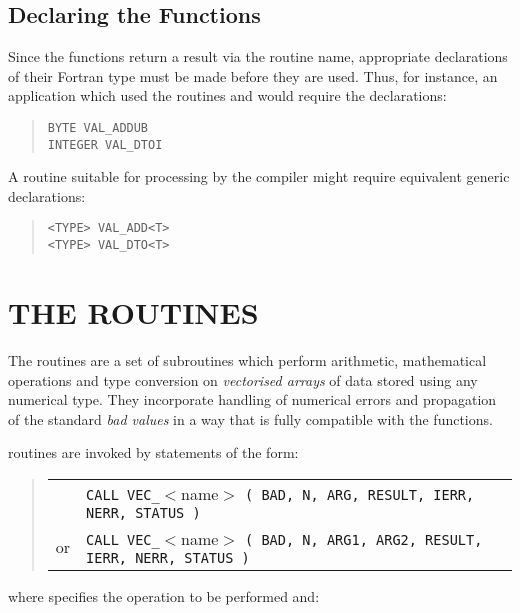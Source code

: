\subsection{Declaring the  Functions}

Since the  functions return a result via the routine name, 
appropriate declarations of their Fortran type must be made before they are 
used.
Thus, for instance, an application which used the routines  
and  would require the declarations: 

\begin{quote}
\verb#BYTE VAL_ADDUB#\\
\verb#INTEGER VAL_DTOI#
\end{quote}

A routine suitable for processing by the  compiler might
require equivalent generic declarations: 

\begin{quote}
\verb#<TYPE> VAL_ADD<T>#\\
\verb#<TYPE> VAL_DTO<T>#
\end{quote}

\section{THE  ROUTINES}

\label{section:vec}

The  routines are a set of subroutines which perform arithmetic,
mathematical operations and type conversion on {\em vectorised arrays} of
data stored using any numerical type. 
They incorporate handling of numerical errors and propagation of the
standard {\em bad values} in a way that is fully compatible with the
 functions. 

 routines are invoked by statements of the form:

\begin{quote}
\begin{tabular}{rl}
& \verb#CALL VEC_#$<$name$>$
\verb#( BAD, N, ARG, RESULT, IERR, NERR, STATUS )#\\
or & \verb#CALL VEC_#$<$name$>$
\verb#( BAD, N, ARG1, ARG2, RESULT, IERR, NERR, STATUS )#
\end{tabular}
\end{quote}

where  specifies the operation to be performed and:

